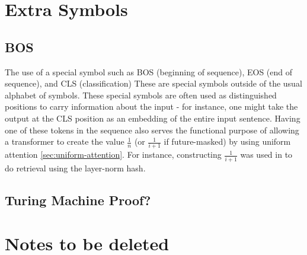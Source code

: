 \section{Extra Symbols}

\subsection{BOS}\label{sec:BOS}

The use of a special symbol such as BOS (beginning of sequence), EOS (end of sequence), and CLS (classification) These are special symbols outside of the usual alphabet of symbols. These special symbols are often used as distinguished positions to carry information about the input - for instance, one might take the output at the CLS position as an embedding of the entire input sentence. Having one of these tokens in the sequence also serves the functional purpose of allowing a transformer to create the value $\frac{1}{n}$ (or $\frac{1}{i+1}$ if future-masked) by using uniform attention \cref{sec:uniform-attention}. For instance, constructing $\frac{1}{i+1}$ was used in \citet{merrill-sabharwal-2024-cot} to do retrieval using the layer-norm hash.

\subsection{Turing Machine Proof?}



\section{Notes to be deleted}



